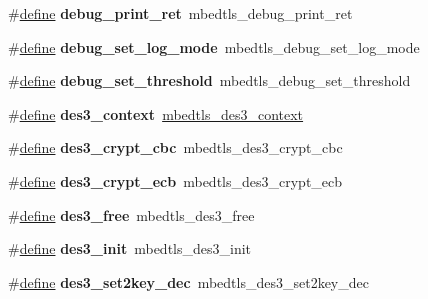 \begin{DoxyCompactItemize}
\item 
\mbox{\label{compat-1_83_8h_a32f983f91edb6927f88517abfc273b0d}} 
\#\hyperlink{structdefine}{define} {\bfseries debug\+\_\+print\+\_\+ret}~mbedtls\+\_\+debug\+\_\+print\+\_\+ret
\item 
\mbox{\label{compat-1_83_8h_ae86e91eeabb315434ec3ef2f544e66c1}} 
\#\hyperlink{structdefine}{define} {\bfseries debug\+\_\+set\+\_\+log\+\_\+mode}~mbedtls\+\_\+debug\+\_\+set\+\_\+log\+\_\+mode
\item 
\mbox{\label{compat-1_83_8h_a4d50121c1043e036594c4c59e945123d}} 
\#\hyperlink{structdefine}{define} {\bfseries debug\+\_\+set\+\_\+threshold}~mbedtls\+\_\+debug\+\_\+set\+\_\+threshold
\item 
\mbox{\label{compat-1_83_8h_a9a7235f5c947e538c86edecc590f2067}} 
\#\hyperlink{structdefine}{define} {\bfseries des3\+\_\+context}~\hyperlink{structmbedtls__des3__context}{mbedtls\+\_\+des3\+\_\+context}
\item 
\mbox{\label{compat-1_83_8h_a905a79f04e3e8a88f565feb6073462c1}} 
\#\hyperlink{structdefine}{define} {\bfseries des3\+\_\+crypt\+\_\+cbc}~mbedtls\+\_\+des3\+\_\+crypt\+\_\+cbc
\item 
\mbox{\label{compat-1_83_8h_ab63ba432feb0601d9fe303fefcae9ee3}} 
\#\hyperlink{structdefine}{define} {\bfseries des3\+\_\+crypt\+\_\+ecb}~mbedtls\+\_\+des3\+\_\+crypt\+\_\+ecb
\item 
\mbox{\label{compat-1_83_8h_aca7694c5ac76acaae82e27bd1226f2f5}} 
\#\hyperlink{structdefine}{define} {\bfseries des3\+\_\+free}~mbedtls\+\_\+des3\+\_\+free
\item 
\mbox{\label{compat-1_83_8h_a461d05406a0e901cb0e59d6382ab6ba5}} 
\#\hyperlink{structdefine}{define} {\bfseries des3\+\_\+init}~mbedtls\+\_\+des3\+\_\+init
\item 
\mbox{\label{compat-1_83_8h_ab48710daa859edb855ea67f24a3eb871}} 
\#\hyperlink{structdefine}{define} {\bfseries des3\+\_\+set2key\+\_\+dec}~mbedtls\+\_\+des3\+\_\+set2key\+\_\+dec
\item 

\end{DoxyCompactItemize}
